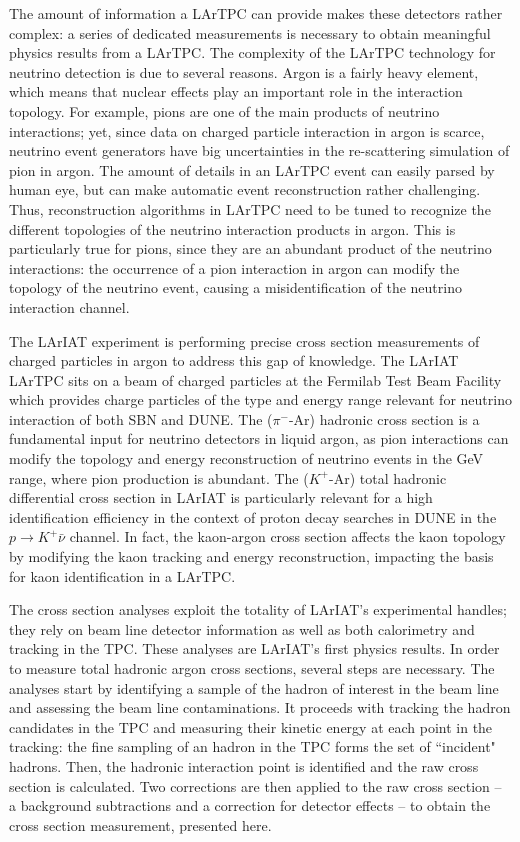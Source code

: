 The amount of information a LArTPC can provide makes these detectors rather complex: a series of dedicated measurements is necessary to obtain meaningful physics results from a LArTPC. The complexity of the LArTPC technology for neutrino detection is due to several reasons. Argon is a fairly heavy element, which means that nuclear effects play an important role in the interaction topology. For example, pions are one of the main products of neutrino interactions; yet,  since data on charged particle interaction in argon is scarce, neutrino event generators have big uncertainties in the re-scattering simulation of pion in argon. %
The amount of details in an LArTPC event can easily  parsed by human eye, but can make automatic event reconstruction rather challenging. Thus, reconstruction algorithms in LArTPC need to be tuned to recognize the different topologies of the neutrino interaction products in argon. This is particularly true for pions, since they are an abundant product of the neutrino interactions: the occurrence of a pion interaction in argon can modify the topology of the neutrino event, causing a misidentification of the neutrino interaction channel.

The LArIAT \cite{Cavanna:2014iqa} experiment is performing precise cross section measurements of charged particles in argon to address this gap of knowledge. 
The LArIAT LArTPC sits on a beam of charged particles at the Fermilab Test Beam Facility which provides charge particles of the type and energy range relevant for neutrino interaction of both SBN and DUNE. The ($\pi^-$-Ar) hadronic cross section is a fundamental input for neutrino detectors in liquid argon, as pion interactions can modify the topology and energy reconstruction of neutrino events in the GeV range, where pion production is abundant. The  ($K^+$-Ar) total hadronic differential cross section in LArIAT is particularly relevant for a high identification efficiency in the context of proton decay searches in DUNE in the  $p\rightarrow K^+\bar{\nu}$  channel. In fact, the kaon-argon cross section affects the kaon topology by modifying the kaon tracking and energy reconstruction, impacting the basis for kaon identification in a LArTPC.  

The cross section analyses exploit the totality of LArIAT's experimental handles; they rely on beam line detector information as well as both calorimetry and tracking in the TPC. These analyses are LArIAT's first physics results. 
In order to measure total hadronic  argon cross sections, several steps are necessary. The analyses start by identifying a sample of the hadron of interest in the beam line and assessing the beam line contaminations. It proceeds with tracking the hadron candidates in the TPC and measuring their kinetic energy at each point in the tracking: the fine sampling of an hadron in the TPC forms the set of ``incident" hadrons.  Then, the hadronic interaction point is identified and the raw cross section is calculated. Two corrections are then applied to the raw cross section -- a background subtractions and a correction for detector effects -- to obtain the cross section measurement, presented here.\\

